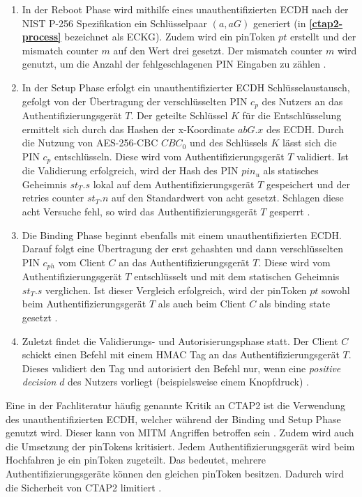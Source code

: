 \begin{enumerate}
    \item In der Reboot Phase wird mithilfe eines unauthentifizierten \ac{ECDH} nach der NIST P-256 Spezifikation ein Schlüsselpaar $(a, aG)$ generiert (in \textbf{\ref{ctap2-process}} bezeichnet als ECKG). Zudem wird ein pinToken $pt$ erstellt und der mismatch counter $m$ auf den Wert drei gesetzt. Der mismatch counter $m$ wird genutzt, um die Anzahl der fehlgeschlagenen PIN Eingaben zu zählen \cite{barbosa2021provable}.  
    \item In der Setup Phase erfolgt ein unauthentifizierter \ac{ECDH} Schlüsselaustausch, gefolgt von der Übertragung der verschlüsselten PIN $c_p$ des Nutzers an das Authentifizierungsgerät $T$. Der geteilte Schlüssel $K$ für die Entschlüsselung ermittelt sich durch das Hashen der x-Koordinate $abG.x$ des \ac{ECDH}. Durch die Nutzung von AES-256-CBC $CBC_0$ und des Schlüssels $K$ lässt sich die PIN $c_p$ entschlüsseln. Diese wird vom Authentifizierungsgerät $T$ validiert. Ist die Validierung erfolgreich, wird der Hash des PIN $pin_u$ als statisches Geheimnis $st_T.s$ lokal auf dem Authentifizierungsgerät $T$ gespeichert und der retries counter $st_T.n$ auf den Standardwert von acht gesetzt. Schlagen diese acht Versuche fehl, so wird das Authentifizierungsgerät $T$ gesperrt \cite{barbosa2021provable} \cite{bindel2022fido2}.
    \item Die Binding Phase beginnt ebenfalls mit einem unauthentifizierten \ac{ECDH}. Darauf folgt eine Übertragung der erst gehashten und dann verschlüsselten PIN $c_{ph}$ vom Client $C$ an das Authentifizierungsgerät $T$. Diese wird vom Authentifizierungsgerät $T$ entschlüsselt und mit dem statischen Geheimnis $st_T.s$ verglichen. Ist dieser Vergleich erfolgreich, wird der pinToken $pt$ sowohl beim Authentifizierungsgerät $T$ als auch beim Client $C$ als binding state gesetzt \cite{barbosa2021provable} \cite{bindel2022fido2}.
    \item Zuletzt findet die Validierungs- und Autorisierungsphase statt. Der Client $C$ schickt einen Befehl mit einem HMAC Tag an das Authentifizierungsgerät $T$. Dieses validiert den Tag und autorisiert den Befehl nur, wenn eine \textit{positive decision} $d$ des Nutzers vorliegt (beispielsweise einem Knopfdruck) \cite{barbosa2021provable} \cite{bindel2022fido2}.
\end{enumerate}

Eine in der Fachliteratur häufig genannte Kritik an \ac{CTAP2} ist die Verwendung des unauthentifizierten \ac{ECDH}, welcher während der Binding und Setup Phase genutzt wird. Dieser kann von \ac{MITM} Angriffen betroffen sein \cite{barbosa2021provable}.
Zudem wird auch die Umsetzung der pinTokens kritisiert. Jedem Authentifizierungsgerät wird beim Hochfahren je ein pinToken zugeteilt. Das bedeutet, mehrere Authentifizierungsgeräte können den gleichen pinToken besitzen. Dadurch wird die Sicherheit von \ac{CTAP2} limitiert \cite{barbosa2021provable}.

